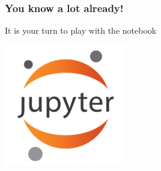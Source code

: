 \documentclass{beamer}
\begin{document}
\begin{frame}
\frametitle{You know a lot already!}

It is your turn to play with the notebook
\bigskip

\centering
\includegraphics[width=0.4\textwidth]{img/jupyter.png}
\end{frame}
% 
% 
% 
% 
% 
% 
% 
% 
% 
% 
\end{document}
